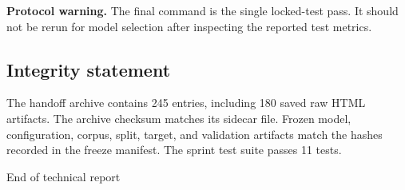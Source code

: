 \documentclass[10pt,a4paper]{article}
\begin{document}
\textbf{Protocol warning.} The final command is the single locked-test pass. It
should not be rerun for model selection after inspecting the reported test metrics.

\subsection{Integrity statement}
The handoff archive contains 245 entries, including 180 saved raw HTML artifacts.
The archive checksum matches its sidecar file. Frozen model, configuration, corpus,
split, target, and validation artifacts match the hashes recorded in the freeze
manifest. The sprint test suite passes 11 tests.

\vfill
\begin{center}
  \color{Muted}\small
  End of technical report
\end{center}
\end{document}
